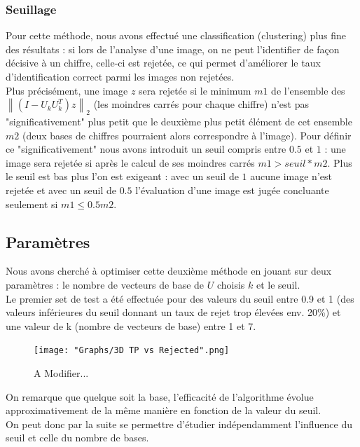 \documentclass[a4paper,11pt,twoside]{report}
\newcommand{\norm}[1]{\left\lVert#1\right\rVert} %
\begin{document}
\subsubsection{Seuillage}%
Pour cette méthode, nous avons effectué une classification (clustering) plus fine des résultats : si lors de l'analyse d'une image, on ne peut l'identifier de façon décisive à un chiffre, celle-ci est rejetée, ce qui permet d'améliorer le taux d'identification correct parmi les images non rejetées. \\
Plus précisément, une image $z$ sera rejetée si le minimum $m1$ de l'ensemble des $ \norm{(I-U_{k}U_{k}^{T})z}_{2}$ (les moindres carrés pour chaque chiffre) n'est pas "significativement" plus petit que le deuxième plus petit élément de cet ensemble $m2$ (deux bases de chiffres pourraient alors correspondre à l'image). Pour définir ce "significativement" nous avons introduit un seuil compris entre $0.5$ et $1$ : une image sera rejetée si après le calcul de ses moindres carrés $m1>seuil*m2$. Plus le seuil est bas plus l'on est exigeant : avec un seuil de $1$ aucune image n'est rejetée et avec un seuil de $0.5$ l'évaluation d'une image est jugée concluante seulement si $m1\leq 0.5m2$.\\
\subsection{Paramètres}
Nous avons cherché à optimiser cette deuxième méthode en jouant sur deux paramètres : le nombre de vecteurs de base de $U$ choisis $k$ et le seuil.\\

Le premier set de test a été effectuée pour des valeurs du seuil entre 0.9 et 1 (des valeurs inférieures du seuil donnant un taux de rejet trop élevées env. 20\%) et une valeur de k (nombre de vecteurs de base) entre 1 et 7.\\

\begin{figure}[H]
  	\texttt{[image: "Graphs/3D TP vs Rejected".png]}
  	\caption{A Modifier...}
\end{figure}

On remarque que quelque soit la base, l'efficacité de l'algorithme évolue approximativement de la même manière en fonction de la valeur du seuil.\\ 
On peut donc par la suite se permettre d'étudier indépendamment l'influence du seuil et celle du nombre de bases.\\
\end{document}
